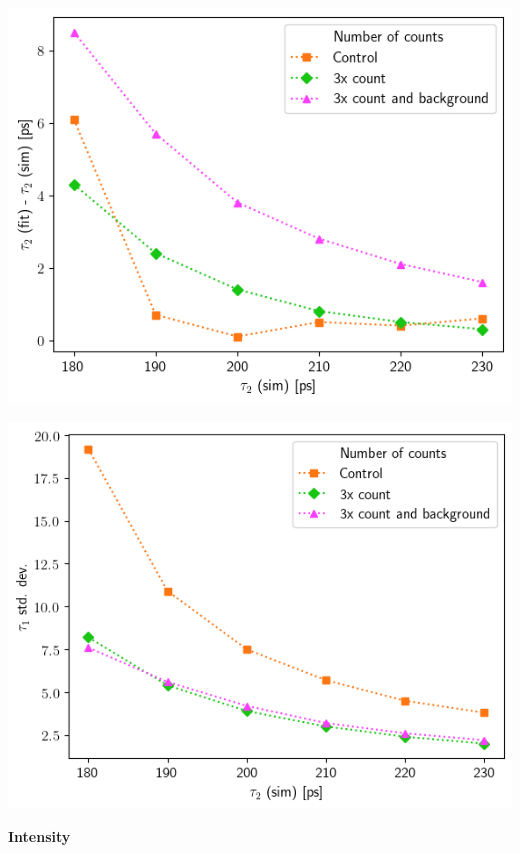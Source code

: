 {\begin{minipage}{ .47\linewidth}
    \includegraphics[width=\linewidth]{Batch 5/t2-diff 8020.png}
    \label{fig:compcount-t2-8020}
\end{minipage}
\hfill
\begin{minipage}{ .47\linewidth}
    \includegraphics[width=\linewidth]{Batch 5/t2-err 8020.png}
    \label{fig:compcount-t2err-8020}
\end{minipage}

\pagebreak
\textbf{Intensity}

}
